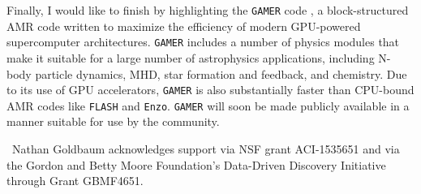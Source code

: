 \documentclass[11pt,twoside]{article}
\begin{document}

Finally, I would like to finish by highlighting the \texttt{GAMER} code \citep{schive2010}, a block-structured AMR code written to maximize the efficiency of modern GPU-powered supercomputer architectures. \texttt{GAMER} includes a number of physics modules that make it suitable for a large number of astrophysics applications, including N-body particle dynamics, MHD, star formation and feedback, and chemistry. Due to its use of GPU accelerators, \texttt{GAMER} is also substantially faster than CPU-bound AMR codes like \texttt{FLASH} and \texttt{Enzo}. \texttt{GAMER} will soon be made publicly available in a manner suitable for use by the community.

\acknowledgements\ Nathan Goldbaum acknowledges support via NSF grant ACI-1535651 and via the Gordon and Betty Moore Foundation's Data-Driven Discovery Initiative through Grant GBMF4651.


\end{document}
